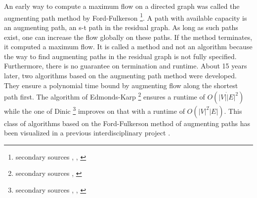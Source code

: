 \section{\pushRelabel{}}
An early way to compute a maximum flow on a directed graph was called the augmenting path method by Ford-Fulkerson \cite{ford1956maximal}\footnote{secondary sources \cite[sec. 6.4]{ahuja1993network}, \cite[sec. 26.2, p.724]{cormen2009introduction}, \cite[sec. 6.1]{jungnickel2013graphs}}. A path with available capacity is an augmenting path, an s-t path in the residual graph. As long as such paths exist, one can increase the flow globally on these paths. If the method terminates, it computed a maximum flow. It is called a method and not an algorithm because the way to find augmenting paths in the residual graph is not fully specified. Furthermore, there is no guarantee on termination and runtime. About 15 years later, two algorithms based on the augmenting path method were developed. They ensure a polynomial time bound by augmenting flow along the shortest path first. The algorithm of Edmonds-Karp \cite{edmonds1972theoretical}\footnote{secondary sources \cite[sec. 26.2, p. 727]{cormen2009introduction}, \cite[sec. 6.2]{jungnickel2013graphs}} ensures a runtime of $O(|V|\dot|E|^2)$ while the one of Dinic \cite{dinic1970algorithm}\footnote{secondary sources \cite[sec. 7.4]{ahuja1993network}, \cite[sec. 26.2]{cormen2009introduction}, \cite[sec. 6.4]{jungnickel2013graphs}} improves on that with a runtime of $O(|V|^2\dot|E|)$. This class of algorithms based on the Ford-Fulkerson method of augmenting paths has been visualized in a previous interdisciplinary project \cite{fischer2016idp}.

